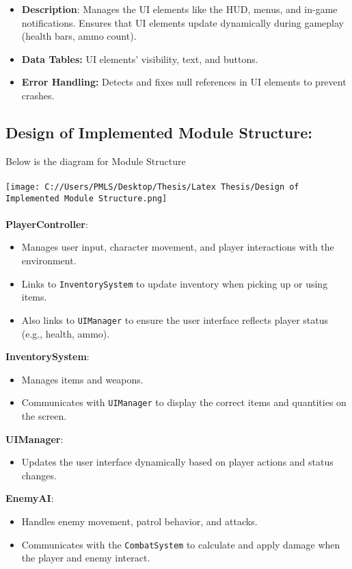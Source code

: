\begin{itemize}
	\item \textbf{Description}: Manages the UI elements like the HUD, menus, and in-game notifications. Ensures that UI elements update dynamically during gameplay (health bars, ammo count).
	\item \textbf{Data Tables:} UI elements’ visibility, text, and buttons.
	\item \textbf{Error Handling:} Detects and fixes null references in UI elements to prevent crashes.
\end{itemize}

\subsection{ Design of Implemented Module Structure:}
Below is the diagram for Module Structure
\\
\\
\texttt{[image: C://Users/PMLS/Desktop/Thesis/Latex Thesis/Design of Implemented Module Structure.png]}
\\
\\
\textbf{PlayerController}:
\begin{itemize}
	\item Manages user input, character movement, and player interactions with the environment.
	\item Links to \texttt{InventorySystem} to update inventory when picking up or using items.
	\item Also links to \texttt{UIManager} to ensure the user interface reflects player status (e.g., health, ammo).
\end{itemize}

\textbf{InventorySystem}:
\begin{itemize}
	\item Manages items and weapons.
	\item Communicates with \texttt{UIManager} to display the correct items and quantities on the screen.
\end{itemize}

\textbf{UIManager}:
\begin{itemize}
	\item Updates the user interface dynamically based on player actions and status changes.
\end{itemize}

\textbf{EnemyAI}:
\begin{itemize}
	\item Handles enemy movement, patrol behavior, and attacks.
	\item Communicates with the \texttt{CombatSystem} to calculate and apply damage when the player and enemy interact.
\end{itemize}

